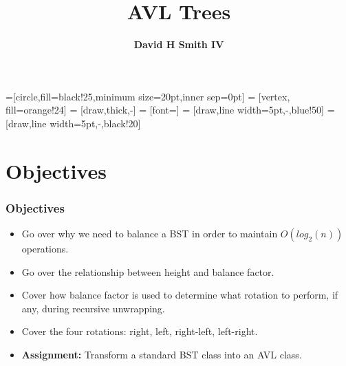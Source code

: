 \documentclass{beamer}
\title{\textbf{AVL Trees}}
\author{\textbf{David H Smith IV}}
\institute[\textbf{UIUC}]{\textbf{University of Illinois Urbana-Champaign}}
\date{}
\begin{document}

=[circle,fill=black!25,minimum size=20pt,inner sep=0pt]
 = [vertex, fill=orange!24]
 = [draw,thick,-]
 = [font=\small]
 = [draw,line width=5pt,-,blue!50]
 = [draw,line width=5pt,-,black!20]


\frame{\titlepage}

\section{Objectives}
\begin{frame}
    \frametitle{Objectives}
    \centering
    \begin{itemize}
        \item Go over why we need to balance a BST in order to maintain $O(log_2(n))$ operations.
        \item Go over the relationship between height and balance factor.
        \item Cover how balance factor is used to determine what rotation to perform, if any, during recursive unwrapping.
        \item Cover the four rotations: right, left, right-left, left-right. 
        \item \textbf{Assignment:} Transform a standard BST class into an AVL class.
    \end{itemize}
\end{frame}
\end{document}
